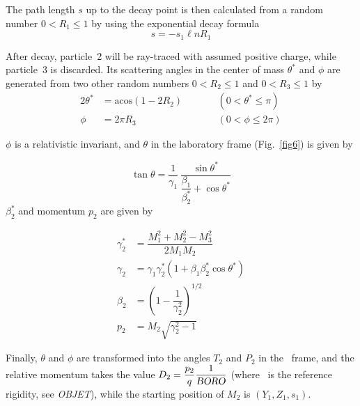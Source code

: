 {\noindent The path length $ s $ up to the decay point is then calculated from
a random number $ 0<R_1\leq 1 $ by using the exponential decay formula
$$ s = - s_1 \ell n R_1 $$

\noindent After decay, particle~2  will  be ray-traced with assumed positive
charge, while particle~3 is discarded.  Its scattering angles in the center of mass 
$ \theta^\ast $ and $\phi$ are generated from two other random numbers 
$0<R_2\leq 1 $ and $ 0<R_3\leq 1 $ by
%
 \begin{alignat*}{2}
	 \theta^ \ast 
	       & =   \textrm{acos} (1 - 2R_2) & \qquad & (0   <\theta^\ast \leq \pi ) \\
	\phi 
	       & =   2\pi R_3         & \qquad &  (0<\phi \leq 2\pi ) 
 \end{alignat*}
%

\smallskip


\noindent $\phi$ is a relativistic invariant, and $\theta$ in the laboratory
frame (Fig.~\ref{fig6}) is given by    

$$ \tan \theta = \dfrac{1 }{ \gamma_1}\, 
    \dfrac{ \sin \theta^ \ast }{\dfrac{\beta_1 }{ \beta^ \ast_ 2}+ \cos \theta^\ast} 
    $$
%
  $ \beta^ \ast_ 2 $ and momentum $ p_2 $ are given by 

 \begin{align*}
	 \gamma^\ast_ 2 
	         & = \dfrac{M^2_1 + M^2_2 - M^2_3 }{ 2M_1M_2} \\
	\gamma_2
	         & =   \gamma_1\gamma^ \ast_ 2 
	         	\left(1+\beta_1 \beta^\ast_ 2 \cos \theta^ \ast \right) \\
	\beta_ 2 
	         & =  \left( 1- \dfrac{1 }{ \gamma^2_2} \right)^{1/2} \\
	p_2 
	         & = M_2 \sqrt{ \gamma^2_2 -1} 
 \end{align*}
 
\noindent Finally, $\theta$ and $\phi$ are transformed into the angles $ T_2 $
and $ P_2 $ in the \zgou\ frame, and the relative momentum takes the value 
$ D_2= \dfrac{p_2 }{ q} \dfrac{1}{\textsl{BORO}} $ (where \BORO\   
is the reference rigidity, see \textsl{OBJET}), while the starting position of 
$M_2 $ is $ (Y_1 , Z_1, s_1) $.   

}
